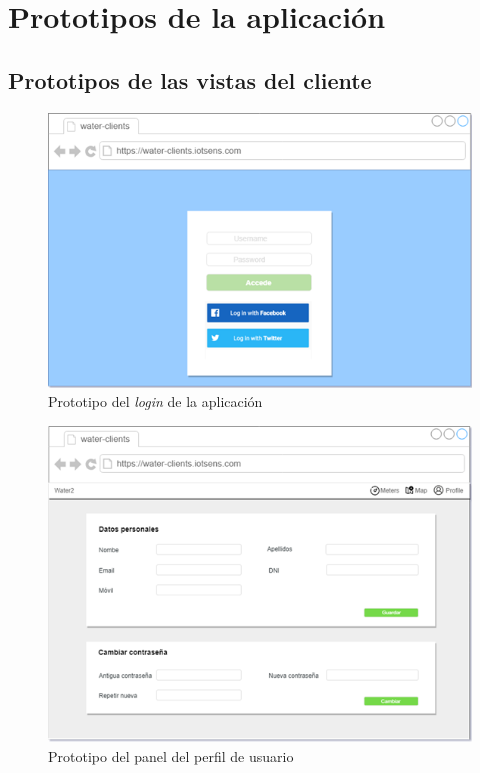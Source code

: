 \documentclass[pdftex,11pt,a4paper]{book}
\begin{document}

\appendix
\renewcommand\appendixname{Anexo}



\chapter{Prototipos de la aplicación} \label{anexo:prototipos-aplicacion}

\section{Prototipos de las vistas del cliente} \label{anexo:prototipos}

\begin{figure}[h]
 \centering
 \includegraphics [scale=1] {images/prototipo/imagen1.png}
 \caption{Prototipo del \textit{login} de la aplicación} \label{fig:prototipo1}
 \end{figure}
 
 \begin{figure}[h]
 \centering
 \includegraphics [scale=1] {images/prototipo/imagen2.png}
 \caption{Prototipo del panel del perfil de usuario} \label{fig:prototipo2}
 \end{figure}
 
\end{document}
